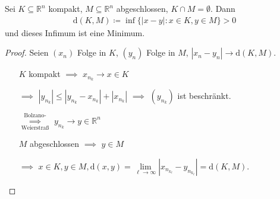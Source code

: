 \documentclass[a4paper,10pt]{scrbook}
\begin{document}
\begin{theorem}[Satz] \label{thm:10.3}
  Sei $K \subseteq \mathbb{R}^n$ kompakt, $M \subseteq \mathbb{R}^n$ abgeschlossen, $K \cap M = \emptyset$. Dann
  \begin{align*}
    \mathrm{d}(K,M) \coloneq \inf \{ |x-y| : x \in K, y \in M \} > 0
  \end{align*}
  und dieses Infimum ist eine Minimum.

  \begin{proof}
    Seien $(x_n)$ Folge in $K$, $(y_n)$ Folge in $M$, $|x_n-y_n| \to \mathrm{d}(K,M)$.
    \begin{itemize}
      \item[] $K$ kompakt $\implies$ $x_{n_k} \to x \in K$

      \item[$\implies$] $|y_{n_k}| \leq |y_{n_k} - x_{n_k}| + |x_{n_k}|$ $\implies$ $(y_{n_k})$ ist beschränkt.

      \item[$\overset{\text{Bolzano-}}{\underset{\text{Weierstraß}}{\implies}}$] $y_{n_k} \to y \in \mathbb{R}^n$

      \item[] $M$ abgeschlossen $\implies$ $y \in M$

      \item[$\implies$] $x \in K , y \in M, \mathrm{d}(x,y) = \lim\limits_{\ell \to \infty}|x_{n_{k_\ell}} - y_{n_{k_\ell}}| = \mathrm{d}(K,M)$.
    \end{itemize}
  \end{proof}
\end{theorem}
\end{document}
